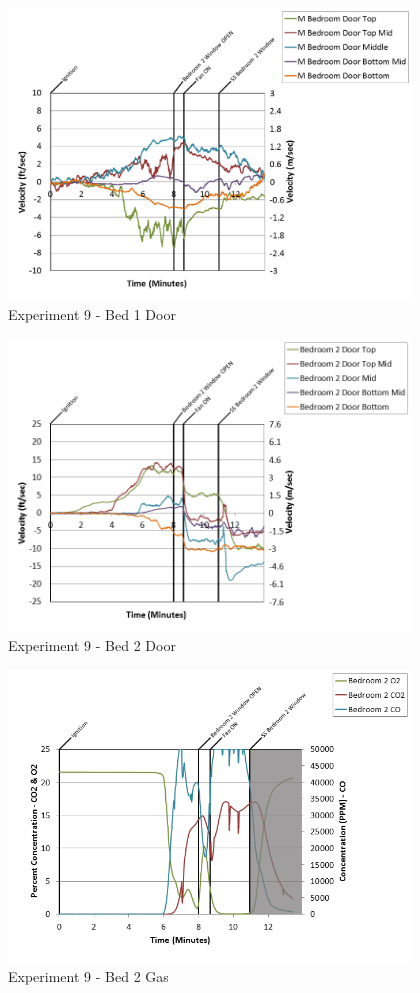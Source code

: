 \documentclass{article}
\begin{document}
\begin{appendices}
\clearpage

\begin{figure}[h!]
	\centering
	\includegraphics[height=3.05in]{0_Images/Results_Charts/Exp_9_Charts/Bed1Door.png}
	\caption{Experiment 9 - Bed 1 Door}
\end{figure}


\begin{figure}[h!]
	\centering
	\includegraphics[height=3.05in]{0_Images/Results_Charts/Exp_9_Charts/Bed2Door.png}
	\caption{Experiment 9 - Bed 2 Door}
\end{figure}

\clearpage

\begin{figure}[h!]
	\centering
	\includegraphics[height=3.05in]{0_Images/Results_Charts/Exp_9_Charts/Bed2Gas.png}
	\caption{Experiment 9 - Bed 2 Gas}
\end{figure}



\end{appendices}
\end{document}
